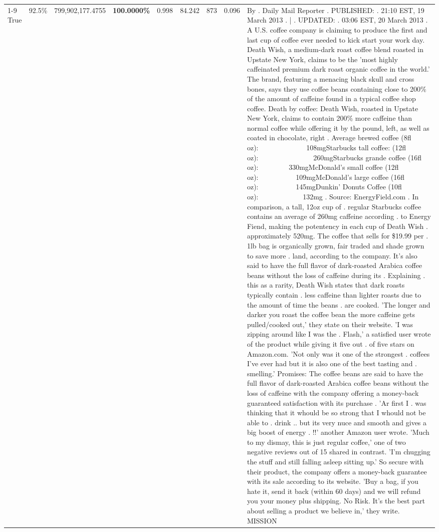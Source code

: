 \begin{table}[H]
{\begin{tabular}{lllrlllll}
\cline{1-9} \cline{2-9}
True & 92.5\% & 799,902,177.4755 & \bfseries \color{red} 100.0000\% & 0.998 & 84.242 & 873 & 0.096 & By . Daily Mail Reporter . PUBLISHED: . 21:10 EST, 19 March 2013 . | . UPDATED: . 03:06 EST, 20 March 2013 . A U.S. coffee company is claiming to produce the first and last cup of coffee ever needed to kick start your work day. Death Wish, a medium-dark roast coffee blend roasted in Upstate New York, claims to be the 'most highly caffeinated premium dark roast organic coffee in the world.' The brand, featuring a menacing black skull and cross bones, says they use coffee beans containing close to 200\% of the amount of caffeine found in a typical coffee shop coffee. Death by coffee: Death Wish, roasted in Upstate New York, claims to contain 200\% more caffeine than normal coffee while offering it by the pound, left, as well as coated in chocolate, right . Average brewed coffee (8fl oz):              108mgStarbucks tall coffee: (12fl oz):                260mgStarbucks grande coffee (16fl oz):         330mgMcDonald's small coffee (12fl oz):           109mgMcDonald's large coffee (16fl oz):           145mgDunkin' Donuts Coffee (10fl oz):             132mg . Source: EnergyField.com . In comparison, a tall, 12oz cup of . regular Starbucks coffee contains an average of 260mg caffeine according . to Energy Fiend, making the potentency in each cup of Death Wish . approximately 520mg. The coffee that sells for \$19.99 per . 1lb bag is organically grown, fair traded and shade grown to save more . land, according to the company. It's also said to have the full flavor of dark-roasted Arabica coffee beans without the loss of caffeine during its . Explaining . this as a rarity, Death Wish states that dark roasts typically contain . less caffeine than lighter roasts due to the amount of time the beans . are cooked. 'The longer and darker you roast the coffee bean the more caffeine gets pulled/cooked out,' they state on their website. 'I was zipping around like I was the . Flash,' a satisfied user wrote of the product while giving it five out . of five stars on Amazon.com. 'Not only was it one of the strongest . coffees I've ever had but it is also one of the best tasting and . smelling.’ Promises: The coffee beans are said to have the full flavor of dark-roasted Arabica coffee beans without the loss of caffeine with the company offering a money-back guaranteed satisfaction with its purchase . 'Ar first I . was thinking that it whould be so strong that I whould not be able to . drink .. but its very nuce and smooth and gives a big boost of energy . !!' another Amazon user wrote. 'Much to my dismay, this is just regular coffee,' one of two negative reviews out of 15 shared in contrast. 'I'm chugging the stuff and still falling asleep sitting up.' So secure with their product, the company offers a money-back guarantee with its sale according to its website. 'Buy a bag, if you hate it, send it back (within 60 days) and we will refund you your money plus shipping. No Risk. It’s the best part about selling a product we believe in,' they write. MISSION \\

\end{tabular}}
\end{table}
